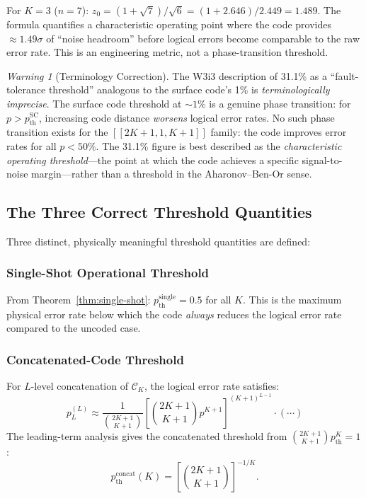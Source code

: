 \documentclass[11pt]{article}
\theoremstyle{definition}
\theoremstyle{remark}
\newtheorem{warning}[theorem]{Warning}
\begin{document}
For $K=3$ ($n=7$): $z_0 = (1+\sqrt{7})/\sqrt{6} = (1 + 2.646)/2.449 = 1.489$.
The formula quantifies a characteristic operating point where the code provides
$\approx 1.49\sigma$ of ``noise headroom'' before logical errors become comparable
to the raw error rate.  This is an engineering metric, not a phase-transition threshold.

\begin{warning}[Terminology Correction]
\label{warn:terminology}
The W3i3 description of 31.1\% as a ``fault-tolerance threshold'' analogous
to the surface code's 1\% is \emph{terminologically imprecise}.  The surface
code threshold at $\sim1\%$ is a genuine phase transition: for $p > p_{\mathrm{th}}^{\mathrm{SC}}$,
increasing code distance \emph{worsens} logical error rates.  No such phase
transition exists for the $[[2K+1,1,K+1]]$ family: the code improves error
rates for all $p < 50\%$.  The 31.1\% figure is best described as the
\emph{characteristic operating threshold}---the point at which the code
achieves a specific signal-to-noise margin---rather than a threshold in the
Aharonov--Ben-Or sense.
\end{warning}

\subsection{The Three Correct Threshold Quantities}
\label{sec:three-thresholds}

Three distinct, physically meaningful threshold quantities are defined:

\subsubsection{Single-Shot Operational Threshold}

From Theorem~\ref{thm:single-shot}: $p_{\mathrm{th}}^{\mathrm{single}} = 0.5$ for all $K$.
This is the maximum physical error rate below which the code \emph{always}
reduces the logical error rate compared to the uncoded case.

\subsubsection{Concatenated-Code Threshold}

For $L$-level concatenation of $\mathcal{C}_K$, the logical error rate satisfies:
\begin{equation}
  p_L^{(L)} \approx \frac{1}{\binom{2K+1}{K+1}}
  \left[\binom{2K+1}{K+1} p^{K+1}\right]^{(K+1)^{L-1}} \cdot (\cdots)
\end{equation}
The leading-term analysis gives the concatenated threshold from
$\binom{2K+1}{K+1}p_{\mathrm{th}}^K = 1$:
\begin{equation}
  \boxed{
  p_{\mathrm{th}}^{\mathrm{concat}}(K) = \left[\binom{2K+1}{K+1}\right]^{-1/K}.
  }
  \label{eq:concat-threshold}
\end{equation}
\end{document}
